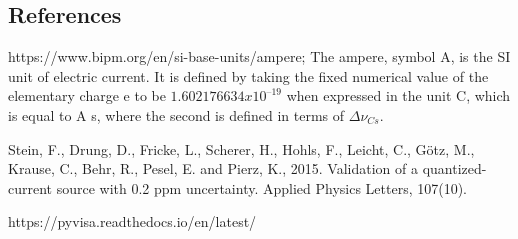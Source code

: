 \documentclass[jkps,preprint,fleqn,showpacs,showkeys]{revtex4}
\begin{document}
\begin{thebibliography}{99}
\section*{References}
https://www.bipm.org/en/si-base-units/ampere;
The ampere, symbol A, is the SI unit of electric current. It is defined by taking the fixed numerical value of the elementary charge e to be $1.602 176 634 x 10^{–19}$ when expressed in the unit C, which is equal to A s, where the second is defined in terms of $\Delta \nu _{Cs}$.

Stein, F., Drung, D., Fricke, L., Scherer, H., Hohls, F., Leicht, C., Götz, M., Krause, C., Behr, R., Pesel, E. and Pierz, K., 2015. Validation of a quantized-current source with 0.2 ppm uncertainty. Applied Physics Letters, 107(10).

https://pyvisa.readthedocs.io/en/latest/


\end{thebibliography}
\end{document}
